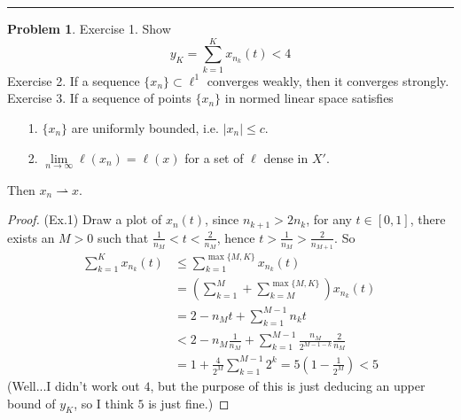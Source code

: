 \documentclass[a4paper, 10pt]{article}
\theoremstyle{definition}
\newtheorem{problem}{Problem}
\theoremstyle{hSol}
\begin{document}
\noindent\rule{16cm}{0.4pt}
\begin{problem} Exercise 1. Show
$$
y_K = \sum_{k=1}^K x_{n_k}(t) < 4
$$
Exercise 2. If a sequence $\{x_n\}\subset \ell^1$ converges weakly, then it converges strongly. \\
Exercise 3. If a sequence of points $\{x_n\}$ in normed linear space satisfies
\begin{itemize}
  \item[1.] $\{x_n\}$ are uniformly bounded, i.e. $|x_n|\leq c$.
  \item[2.] $\lim\limits_{n\rightarrow\infty} \ell(x_n) = \ell(x)$ for a set of $\ell$ dense in $X'$.
\end{itemize}
Then $x_n \rightharpoonup x$.
\end{problem}

\begin{proof} (Ex.1) Draw a plot of $x_n(t)$, since $n_{k+1}>2n_k$, for any $t\in[0,1]$, there exists an $M>0$ such that $\frac{1}{n_M}< t<\frac{2}{n_M}$, hence $t> \frac{1}{n_M} >\frac{2}{n_{M+1}}$. So
\begin{equation}
  \begin{split}
    \sum_{k=1}^K x_{n_k}(t) &\leq \sum_{k=1}^{\max\{M,K\}} x_{n_k}(t) \\
    &= \left(\sum_{k=1}^{M} + \sum_{k=M}^{\max\{M,K\}}\right)x_{n_k}(t) \\
    &= 2-n_Mt + \sum_{k=1}^{M-1} n_kt \\
    &< 2-n_M\frac{1}{n_M} + \sum_{k=1}^{M-1}\frac{n_M}{2^{M-1-k}} \frac{2}{n_M}\\
    &= 1+\frac{4}{2^M} \sum_{k=1}^{M-1} 2^k = 5\left(1-\frac{1}{2^M}\right) < 5
  \end{split} 
\end{equation}
(Well...I didn't work out $4$, but the purpose of this is just deducing an upper bound of $y_K$, so I think $5$ is just fine.)
\end{proof}

~
\end{document}
